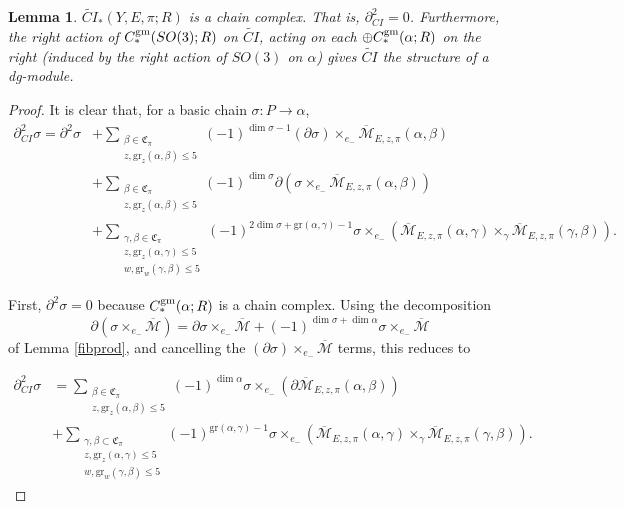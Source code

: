 \documentclass[10pt,a4paper]{amsart}
\newtheorem{lemma}[theorem]{Lemma}
\theoremstyle{definition}
\theoremstyle{remark}
\numberwithin{figure}{qchap}
\begin{document}
\begin{lemma}\label{complex}$\widetilde{CI}_*(Y,E,\pi;R)$ is a chain complex. That is, $\partial_{CI}^2 = 0$. Furthermore, the right action of $C_*^{\textup{gm}}(SO(3);R)$ on $\widetilde{CI}$, acting on each $\oplus C_*^{\textup{gm}}(\alpha;R)$ on the right (induced by the right action of $SO(3)$ on $\alpha$) gives $\widetilde{CI}$ the structure of a dg-module.
\end{lemma}

\begin{proof}It is clear that, for a basic chain $\sigma: P \to \alpha$,
\begin{align*}\partial_{CI}^2 \sigma = \partial^2 \sigma &+ \sum_{\substack{\beta \in \mathfrak C_\pi\\z, \text{gr}_z(\alpha, \beta) \leq 5}} (-1)^{\dim \sigma - 1} (\partial \sigma) \times_{e_-} \overline{\mathcal M}_{E,z,\pi}(\alpha, \beta) \\
&+ \sum_{\substack{\beta \in \mathfrak C_\pi\\z, \text{gr}_z(\alpha, \beta) \leq 5}} (-1)^{\dim \sigma} \partial\left(\sigma \times_{e_-} \overline{\mathcal M}_{E,z,\pi}(\alpha, \beta)\right)\\
&+ \sum_{\substack{\gamma, \beta \in \mathfrak C_\pi\\z, \text{gr}_z(\alpha, \gamma) \leq 5\\ w, \text{gr}_w(\gamma,\beta) \leq 5}}(-1)^{2\dim \sigma + \text{gr}(\alpha, \gamma)-1}\sigma \times_{e_-} \left(\overline{\mathcal M}_{E,z,\pi}(\alpha, \gamma) \times_{\gamma} \overline{\mathcal M}_{E,z,\pi}(\gamma, \beta)\right).\end{align*} 

First, $\partial^2 \sigma = 0$ because $C_*^{\textup{gm}}(\alpha;R)$ is a chain complex. Using the decomposition $$\partial(\sigma \times_{e_-} \overline{\mathcal M})= \partial \sigma \times_{e_-} \overline{\mathcal M} + (-1)^{\dim \sigma + \dim \alpha} \sigma \times_{e_-} \overline{\mathcal M}$$ of Lemma \ref{fibprod}, and cancelling the $(\partial \sigma) \times_{e_-} \overline{\mathcal M}$ terms, this reduces to

\begin{align*}\partial_{CI}^2 \sigma &= \sum_{\substack{\beta \in \mathfrak C_\pi\\z, \text{gr}_z(\alpha, \beta) \leq 5}} (-1)^{\dim \alpha}\sigma \times_{e_-} \left(\partial \overline{\mathcal M}_{E,z,\pi}(\alpha, \beta)\right) \\ 
&+ \sum_{\substack{\gamma, \beta \subset \mathfrak C_\pi\\z, \text{gr}_z(\alpha, \gamma) \leq 5\\ w, \text{gr}_w(\gamma,\beta) \leq 5}} (-1)^{\text{gr}(\alpha, \gamma) - 1} \sigma \times_{e_-} \left(\overline{\mathcal M}_{E,z,\pi}(\alpha, \gamma) \times_{\gamma} \overline{\mathcal M}_{E,z,\pi}(\gamma, \beta)\right).\end{align*} 


\end{proof}
\end{document}
